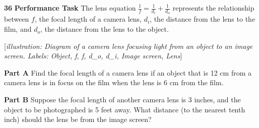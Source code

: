 \documentclass{article}
\newenvironment{practice}[2]{\textbf{#1}\quad}{\par}
\newcommand{\answer}[1]{}
\newcommand{\placeholder}[2]{[\textit{#1: #2}]}
\begin{document}
\begin{practice}{36}{unknown}
\textbf{Performance Task} The lens equation $\frac{1}{f} = \frac{1}{d_i} + \frac{1}{d_o}$ represents the relationship between $f$, the focal length of a camera lens, $d_i$, the distance from the lens to the film, and $d_o$, the distance from the lens to the object.

\placeholder{illustration}{Diagram of a camera lens focusing light from an object to an image screen. Labels: Object, f, f, d_o, d_i, Image screen, Lens}

\textbf{Part A} Find the focal length of a camera lens if an object that is 12 cm from a camera lens is in focus on the film when the lens is 6 cm from the film.

\textbf{Part B} Suppose the focal length of another camera lens is 3 inches, and the object to be photographed is 5 feet away. What distance (to the nearest tenth inch) should the lens be from the image screen?
\answer{}
\end{practice}
\end{document}
